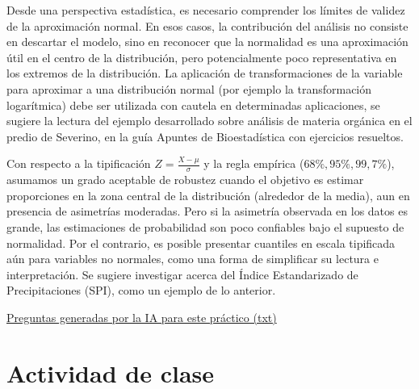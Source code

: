 \documentclass[
  spanish,
  letterpaper,
  DIV=11,
  numbers=noendperiod]{scrreprt}
\begin{document}
Desde una perspectiva estadística, es necesario comprender los límites
de validez de la aproximación normal. En esos casos, la contribución del
análisis no consiste en descartar el modelo, sino en reconocer que la
normalidad es una aproximación útil en el centro de la distribución,
pero potencialmente poco representativa en los extremos de la
distribución. La aplicación de transformaciones de la variable para
aproximar a una distribución normal (por ejemplo la transformación
logarítmica) debe ser utilizada con cautela en determinadas
aplicaciones, se sugiere la lectura del ejemplo desarrollado sobre
análisis de materia orgánica en el predio de Severino, en la guía
Apuntes de Bioestadística con ejercicios resueltos.

Con respecto a la tipificación \(Z = \frac{X - \mu}{\sigma}\) y la regla
empírica (\(68\%,95\%,99,7\%\)), asumamos un grado aceptable de robustez
cuando el objetivo es estimar proporciones en la zona central de la
distribución (alrededor de la media), aun en presencia de asimetrías
moderadas. Pero si la asimetría observada en los datos es grande, las
estimaciones de probabilidad son poco confiables bajo el supuesto de
normalidad. Por el contrario, es posible presentar cuantiles en escala
tipificada aún para variables no normales, como una forma de simplificar
su lectura e interpretación. Se sugiere investigar acerca del Índice
Estandarizado de Precipitaciones (SPI), como un ejemplo de lo anterior.

\href{./ACTIVIDADES\%20CLASE/NORMAL/pre-clase_normal.txt}{Preguntas
generadas por la IA para este práctico (txt)}

\section{\texorpdfstring{\textbf{Actividad de
clase}}{Actividad de clase}}\label{actividad-de-clase-1}
\end{document}
